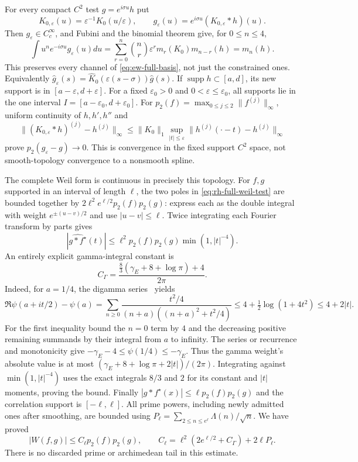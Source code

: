 For every compact $C^2$ test $g=e^{i\sigma u}h$ put
\[
 K_{0,\varepsilon}(u)=\varepsilon^{-1}K_0(u/\varepsilon),\qquad
 g_\varepsilon(u)=e^{i\sigma u}(K_{0,\varepsilon}*h)(u).
\]
Then $g_\varepsilon\in C_c^\infty$, and Fubini and the binomial
theorem give, for $0\le n\le4$,
\[
 \int u^n e^{-i\sigma u}g_\varepsilon(u)du
 =\sum_{r=0}^n\binom nr\varepsilon^r m_r(K_0)m_{n-r}(h)=m_n(h).
\]
This preserves every channel of \eqref{eq:ew-full-basis}, not just
the constrained ones. Equivalently
$\widehat g_\varepsilon(s)=
 \widehat K_0(\varepsilon(s-\sigma))\widehat g(s)$.
If $\operatorname{supp}h\subset[a,d]$, its new support is in
$[a-\varepsilon,d+\varepsilon]$. For a fixed $\varepsilon_0>0$
and $0<\varepsilon\le\varepsilon_0$, all supports lie in the one
interval $I=[a-\varepsilon_0,d+\varepsilon_0]$.
For $p_2(f)=\max_{0\le j\le2}\|f^{(j)}\|_\infty$,
uniform continuity of $h,h',h''$ and
\[
 \|(K_{0,\varepsilon}*h)^{(j)}-h^{(j)}\|_\infty
 \le\|K_0\|_1\sup_{|t|\le\varepsilon}
                  \|h^{(j)}(\cdot-t)-h^{(j)}\|_\infty
\]
prove $p_2(g_\varepsilon-g)\to0$. This is convergence in the fixed
support $C^2$ space, not smooth-topology convergence to a nonsmooth
spline.

The complete Weil form is continuous in precisely this topology.
For $f,g$ supported in an interval of length $\ell$, the two poles
in \eqref{eq:rh-full-weil-test} are bounded together by
$2\ell^2e^{\ell/2}p_2(f)p_2(g)$: express each as the double
integral with weight $e^{\pm(u-v)/2}$ and use $|u-v|\le\ell$.
Twice integrating each Fourier transform by parts gives
\[
 |\widehat{g*f^\star}(t)|\le
 \ell^2p_2(f)p_2(g)\min(1,|t|^{-4}).
\]
An entirely explicit gamma-integral constant is
\[
 C_\Gamma=\frac{\frac83(\gamma_E+8+\log\pi)+4}{2\pi}.
\]
Indeed, for $a=1/4$, the digamma series~\cite[(5.7.6)]{askeyRoyDLMF5} yields
\[
 \Re\psi(a+it/2)-\psi(a)
 =\sum_{n\ge0}\frac{t^2/4}{(n+a)((n+a)^2+t^2/4)}
 \le4+\tfrac12\log(1+4t^2)\le4+2|t|.
\]
For the first inequality bound the $n=0$ term by $4$ and the
decreasing positive remaining summands by their integral from $a$
to infinity. The series or recurrence and monotonicity give
$-\gamma_E-4\le\psi(1/4)\le-\gamma_E$.
Thus the gamma weight's absolute value is at most
$(\gamma_E+8+\log\pi+2|t|)/(2\pi)$.
Integrating against $\min(1,|t|^{-4})$ uses the exact integrals
$8/3$ and $2$ for its constant and $|t|$ moments, proving the bound.
Finally $|g*f^\star(x)|\le\ell p_2(f)p_2(g)$ and the correlation
support is $[-\ell,\ell]$. All prime powers, including newly admitted
ones after smoothing, are bounded using
$P_\ell=\sum_{2\le n\le e^\ell}\Lambda(n)/\sqrt n$.
We have proved
\begin{equation}
 |W(f,g)|\le C_\ell p_2(f)p_2(g),\qquad
 C_\ell=\ell^2(2e^{\ell/2}+C_\Gamma)+2\ell P_\ell.
 \label{eq:ew-continuity}
\end{equation}
There is no discarded prime or archimedean tail in this estimate.

